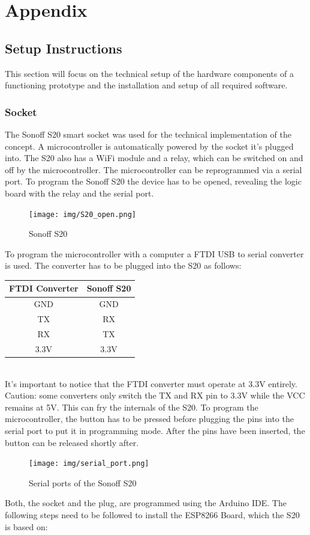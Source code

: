 \section{Appendix}
\label{sec:appendix}
\subsection{Setup Instructions}
This section will focus on the technical setup of the hardware components of a functioning prototype and the installation and setup of all required software.
\\
\subsubsection{Socket}
The Sonoff S20 smart socket was used for the technical implementation of the concept. A microcontroller is automatically powered by the socket it's plugged into. The S20 also has a WiFi module and a relay, which can be switched on and off by the microcontroller. The microcontroller can be reprogrammed via a serial port. To program the Sonoff S20 the device has to be opened, revealing the logic board with the relay and the serial port.
\\
\begin{figure}[H]
    \texttt{[image: img/S20\_open.png]}
    \caption{Sonoff S20}
    \label{fig:S20}
\end{figure}
\newpage
To program the microcontroller with a computer a FTDI USB to serial converter is used. The converter has to be plugged into the S20 as follows:
\\
\begin{center}
    \begin{tabular} { |c|c| }
        \hline
        FTDI Converter & Sonoff S20 \\
        \hline\hline
        GND & GND \\
        \hline
        TX & RX \\
        \hline
        RX & TX \\
        \hline
        3.3V & 3.3V \\
        \hline
    \end{tabular}
    \label{tab:ftdi}
\end{center}
\leavevmode
\\
It's important to notice that the FTDI converter must operate at 3.3V entirely. Caution: some converters only switch the TX and RX pin to 3.3V while the VCC remains at 5V. This can fry the internals of the S20. To program the microcontroller, the button has to be pressed before plugging the pins into the serial port to put it in programming mode. After the pins have been inserted, the button can be released shortly after.
\\
\begin{figure}[H]
    \texttt{[image: img/serial\_port.png]}
    \caption{Serial ports of the Sonoff S20}
    \label{fig:S20_serial}
\end{figure}
\newpage
Both, the socket and the plug, are programmed using the Arduino IDE. The following steps need to be followed to install the ESP8266 Board, which the S20 is based on:

